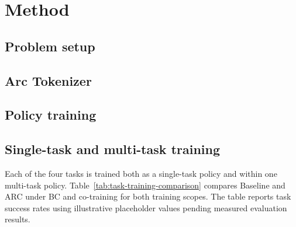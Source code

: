 \section{Method}
\label{sec:method}

\subsection{Problem setup}
\label{sec:problem-setup}


\subsection{Arc Tokenizer}
\label{sec:arc-tokenizer}


\subsection{Policy training}
\label{sec:policy-training}


\subsection{Single-task and multi-task training}
\label{sec:task-training-comparison}

Each of the four tasks is trained both as a single-task policy and within one
multi-task policy. Table~\ref{tab:task-training-comparison} compares Baseline
and ARC under BC and co-training for both training scopes. The table reports
task success rates using illustrative placeholder values pending measured
evaluation results.


